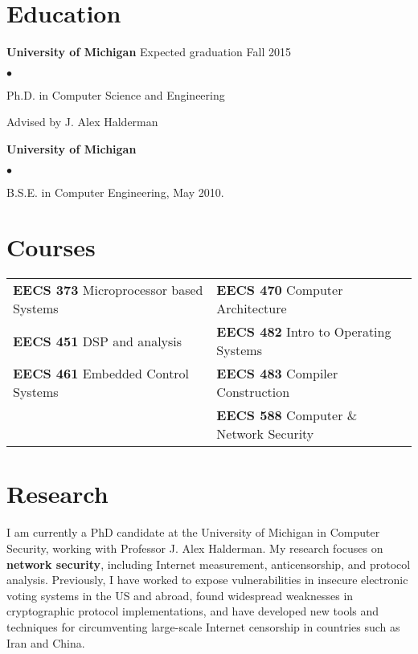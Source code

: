 \documentclass{res}
\newcommand{\sqitem}{\item[\tiny$\blacksquare$]}
\newcommand{\sqlist}{\begin{list}{$\bullet$}
  { \setlength{\itemsep}{0pt}
	\setlength{\parsep}{0pt}
	\setlength{\topsep}{0pt}
	\setlength{\partopsep}{0pt}
	\setlength{\leftmargin}{6.0em}
	\setlength{\labelsep}{2.5em} } }
\newcommand{\sqend}{\end{list}}
\begin{document}

\address{\emph{Current Address}	\\
			1885 Fuller Rd	\\
			Ann Arbor, MI 48105			\\
										\\
			phone: 734.330.8702			\\
			email: ewust@umich.edu}

\begin{resume}

\section{Education}
	\textbf{University of Michigan}  Expected graduation Fall 2015%
	\sqlist	
		\sqitem Ph.D. in Computer Science and Engineering 
        \sqitem Advised by J. Alex Halderman
	\sqend

	\textbf{University of Michigan}
	\sqlist
		\sqitem B.S.E. in Computer Engineering, May 2010.
	\sqend

\section{Courses}
	\begin{tabular}{l l}
	\textbf{EECS 373} Microprocessor based Systems & 
					\textbf{EECS 470} Computer Architecture \\
	\textbf{EECS 451} DSP and analysis & 
					\textbf{EECS 482} Intro to Operating Systems \\
	\textbf{EECS 461} Embedded Control Systems & 
					\textbf{EECS 483} Compiler Construction \\
											  &
					\textbf{EECS 588} Computer \& Network Security \\
	\end{tabular}
\fi

\section{Research}

I am currently a PhD candidate at the University of Michigan in Computer
Security, working with Professor J. Alex Halderman. My research focuses on
\textbf{network security}, including Internet measurement, anticensorship, and protocol
analysis.  Previously, I have worked to expose vulnerabilities in insecure
electronic voting systems in the US and abroad, found widespread weaknesses in
cryptographic protocol implementations, and have developed new tools and
techniques for circumventing large-scale Internet censorship in countries such
as Iran and China.



\end{resume}
\end{document}
